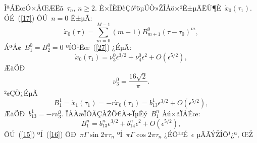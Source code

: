 \documentclass[12pt,openany,CJK,oneside]{cctbook}
\begin{document}
{ÎªÁËœÓ×ÅŒÆËã\ $\tau_{n}$, $n\geq2$. Ê×ÏÈÐèÇó³öµÚÒ»ŽÎÅö×²Ê±µÄËÙ¶È\ $\dot{x}_{0}(\tau_{1})$. ÓÉ\ (\ref{17}) ÔÚ\ $n = 0$ Ê±µÃ:
\begin{equation}\label{39}
  \dot{x}_{0}(\tau)=\sum_{m=0}^{M-1} (m+1)B_{m+1}^{0}(\tau-\tau_{0})^{m},
\end{equation}
ÁªÁ¢\ $B_{1}^{0}=B_{2}^{0}=0$ ºÍÕ¹Êœ\ (\ref{27}) ¿ÉµÃ:
\begin{equation}\label{40}
  \dot{x}_{0}(\tau_{1})=\nu_{3}^{0}\epsilon^{3/2}+\nu_{4}^{0}\epsilon^{2}+O(\epsilon^{5/2}),
\end{equation}
ÆäÖÐ
\begin{equation}\label{41}
\nu_{3}^{0}=\frac{16\sqrt{2}}{\pi}.
\end{equation}
²¢ÇÒ¿ÉµÃ
  \begin{equation}\label{43}
    B_{1}^{1}=\dot{x}_{1}(\tau_{1})=-r\dot{x}_{0}(\tau_{1})=b_{13}^{1}\epsilon^{3/2}+O(\epsilon^{5/2}),
  \end{equation}
ÆäÖÐ\ $b_{13}^{1}=-r\nu_{3}^{0}$.
ÏÂÃæÎÒÃÇÀŽÖ€Ã÷ÏµÊý\ $B_{1}^{n}$ Âú×ãÏÂÊœ:
\begin{equation}\label{45}
 B_{1}^{n}=b_{13}^{n}\epsilon^{3/2}+b_{14}^{n}\epsilon^{2}+O(\epsilon^{5/2}),
\end{equation}
ÔÚ\ (\ref{15}) ºÍ\ (\ref{16}) ÖÐ\ $\pi\Gamma\sin2\pi\tau_{n}$ ºÍ\ $\pi\Gamma\cos2\pi\tau_{n}$ ¿ÉÕ¹³É\ $\epsilon$ µÄÃÝŽÎÕ¹¿ª, ŒŽ

}
\end{document}
